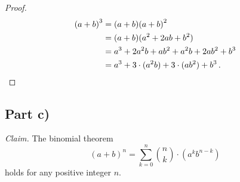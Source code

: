 \documentclass{abrice}
\begin{document}
\begin{proof}
  \begin{align*}
    {(a + b)}^3
    &= (a + b){(a + b)}^2 \\
    &= (a + b)(a^2 + 2ab + b^2) \\
    &= a^3 + 2a^2b + ab^2 + a^2b + 2ab^2 + b^3 \\
    &= a^3 + 3 \cdot (a^2b) + 3 \cdot (ab^2) + b^3\, . \qedhere
  \end{align*}
\end{proof}

\subsection{Part c)}

\emph{Claim.} The binomial theorem
\[
  {(a + b)}^n = \sum_{k=0}^n {n \choose k} \cdot (a^k b^{n-k})
\]
holds for any positive integer $n$.
\end{document}
